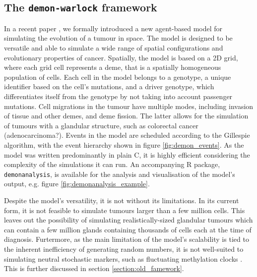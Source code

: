 \subsection{The \texttt{demon-warlock} framework}
In a recent paper \cite{bak_warlock_2023}, we formally introduced a new agent-based model for simulating the
evolution of a tumour in space. The model is designed to be versatile and able to simulate a wide range of
spatial configurations and evolutionary properties of cancer. Spatially, the model is based on a 2D grid, where
each grid cell represents a deme, that is a spatially homogeneous population of cells. Each cell in the model
belongs to a genotype, a unique identifier based on the cell's mutations, and a driver genotype, which differentiates
itself from the genotype by not taking into account passenger mutations. Cell migrations in the tumour have multiple
modes, including invasion of tissue and other demes, and deme fission. The latter allows for the simulation of
tumours with a glandular structure, such as colorectal cancer (adenocarcinoma?). Events in the model are scheduled according to the
Gillespie algorithm, with the event hierarchy shown in figure \ref{fig:demon_events}. As the model was written
predominantly in plain C, it is highly efficient considering the complexity of the simulations it can run. An
accompanying R package, \texttt{demonanalysis}, is available for the analysis and visualisation of the model's
output, e.g. figure \ref{fig:demonanalysis_example}. \par
Despite the model's versatility, it is not without its limitations. In its current form, it is not feasible to
simulate tumours larger than a few million cells. This leaves out the possibility of simulating realistically-sized
glandular tumours which can contain a few million glands containing thousands of cells each at the time of diagnosis.
Furtermore, as the main limitation of the model's scalability is tied to the inherent inefficiency of generating
random numbers, it is not well-suited to simulating neutral stochastic markers, such as fluctuating methylation
clocks \cite{gabbutt_fluctuating_2022}. This is further discussed in section \ref{section:old_famework}.

